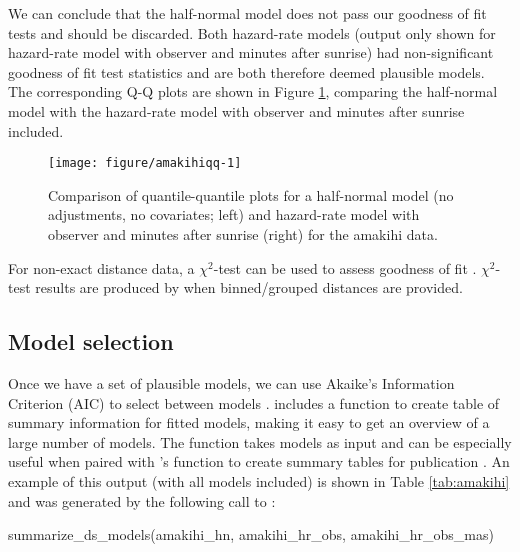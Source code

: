 \documentclass[article]{jss}\usepackage[]{graphicx}\usepackage[]{color}
\makeatletter
\def\maxwidth{ %
  \ifdim\Gin@nat@width>\linewidth
    \linewidth
  \else
    \Gin@nat@width
  \fi
}
\makeatother
\begin{document}
We can conclude that the half-normal model does not pass our goodness of fit tests and should be discarded. Both hazard-rate models (output only shown for hazard-rate model with observer and minutes after sunrise) had non-significant goodness of fit test statistics and are both therefore deemed plausible models. The corresponding Q-Q plots are shown in Figure \ref{amakihi-qq}, comparing the half-normal model with the hazard-rate model with observer and minutes after sunrise included.

\begin{figure}
\begin{center}
\begin{Schunk}

\texttt{[image: figure/amakihiqq-1]} \end{Schunk}
\caption{Comparison of quantile-quantile plots for a half-normal model (no adjustments, no covariates; left) and hazard-rate model with observer and minutes after sunrise (right) for the amakihi data.}
\label{amakihi-qq}
\end{center}
\end{figure}

For non-exact distance data, a $\chi^2$-test can be used to assess goodness of fit \citep[see][Section 3.4.4]{Buckland:2001vm}. $\chi^2$-test results are produced by  when binned/grouped distances are provided.

\subsection{Model selection}

Once we have a set of plausible models, we can use Akaike's Information Criterion (AIC) to select between models \citep[see e.g.][]{burnham2003model}.  includes a function to create table of summary information for fitted models, making it easy to get an overview of a large number of models. The  function takes models as input and can be especially useful when paired with 's  function to create summary tables for publication \citep{knitr-pkg}. An example of this output (with all models included) is shown in Table \ref{tab:amakihi} and was generated by the following call to :

\begin{Code}
summarize_ds_models(amakihi_hn, amakihi_hr_obs, amakihi_hr_obs_mas)
\end{Code}
\end{document}
